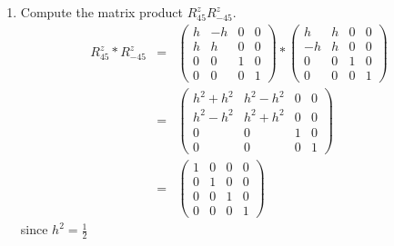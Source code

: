 \documentclass{book}
\begin{document}
\begin{enumerate}
\item Compute the matrix product $R^z_{45} R^z_{-45}$.
\begin{eqnarray*}
R^z_{45}  * R^z_{-45}  &=&
\left (
\begin{array}{cccc}
h & -h & 0 & 0 \\
h & h & 0 & 0 \\
0 & 0 & 1 & 0 \\
0 & 0 & 0 & 1
\end{array}
\right )
*
\left (
\begin{array}{cccc}
h & h & 0 & 0 \\
-h & h & 0 & 0 \\
0 & 0 & 1 & 0 \\
0 & 0 & 0 & 1
\end{array}
\right )
\\
&=&
\left (
\begin{array}{cccc}
h^2+h^2 & h^2-h^2 & 0 & 0 \\
h^2-h^2 & h^2+h^2 & 0 & 0 \\
0 & 0 & 1 & 0 \\
0 & 0 & 0 & 1
\end{array}
\right )
\\
&=&
\left (
\begin{array}{cccc}
1 & 0 & 0 & 0 \\
0 & 1 & 0 & 0 \\
0 & 0 & 1 & 0 \\
0 & 0 & 0 & 1
\end{array}
\right )
\end{eqnarray*}
since $h^2 = \frac{1}{2}$


\end{enumerate}
\end{document}
